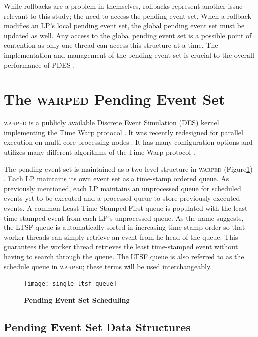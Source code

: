 \documentclass[11pt]{book}
\begin{document}
While rollbacks are a problem in themselves, rollbacks represent another issue relevant to
this study; the need to access the pending event set.  When a rollback modifies an LP's
local pending event set, the global pending event set must be updated as well.  Any access
to the global pending event set is a possible point of contention as only one thread can
access this structure at a time.  The implementation and management of the pending event
set is crucial to the overall performance of PDES \cite{twpes}.

\section{The \textsc{warped} Pending Event Set}

\textsc{warped} is a publicly available Discrete Event Simulation (DES) kernel
implementing the Time Warp protocol \cite{martin,fujimoto}.  It was recently redesigned
for parallel execution on multi-core processing nodes \cite{muthalagu}.  It has many
configuration options and utilizes many different algorithms of the Time Warp protocol
\cite{fujimoto}.

The pending event set is maintained as a two-level structure in \textsc{warped}
(Figure\ref{fig:singleLTSFqueue}) \cite{dickman}.  Each LP maintains its own event set as
a time-stamp ordered queue.  As previously mentioned, each LP maintains an unprocessed
queue for scheduled events yet to be executed and a processed queue to store previously
executed events.  A common Least Time-Stamped First queue is populated with the least time
stamped event from each LP's unprocessed queue.  As the name suggests, the LTSF queue is
automatically sorted in increasing time-stamp order so that worker threads can simply
retrieve an event from he head of the queue.  This guarantees the worker thread retrieves
the least time-stamped event without having to search through the queue. The LTSF queue is
also referred to as the schedule queue in \textsc{warped}; these terms will be used
interchangeably.  

\begin{figure}
    \centering
    \graphicspath{ {./figures/} }
    \texttt{[image: single\_ltsf\_queue]}
    \caption{\textbf{Pending Event Set Scheduling}}\label{fig:singleLTSFqueue}
\end{figure}


\subsection{Pending Event Set Data Structures}
\end{document}
